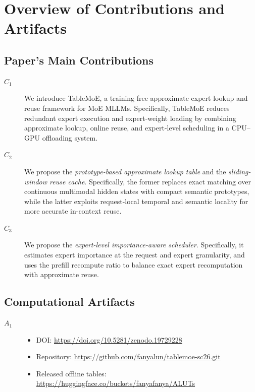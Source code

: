 \documentclass[conference]{IEEEtran}
\begin{document}

\appendixAD

\section{Overview of Contributions and Artifacts}

\subsection{Paper's Main Contributions}

\begin{description}
\item[$C_1$] We introduce TableMoE, a training-free approximate expert lookup
and reuse framework for MoE MLLMs. Specifically, TableMoE reduces redundant
expert execution and expert-weight loading by combining approximate lookup,
online reuse, and expert-level scheduling in a CPU--GPU offloading system.
\item[$C_2$] We propose the \textit{prototype-based approximate lookup table}
and the \textit{sliding-window reuse cache}. Specifically, the former replaces
exact matching over continuous multimodal hidden states with compact semantic
prototypes, while the latter exploits request-local temporal and semantic
locality for more accurate in-context reuse.
\item[$C_3$] We propose the \textit{expert-level importance-aware scheduler}.
Specifically, it estimates expert importance at the request and expert
granularity, and uses the prefill recompute ratio to balance exact expert
recomputation with approximate reuse.
\end{description}

\subsection{Computational Artifacts}

\begin{description}
\item[$A_1$]
\begin{itemize}
\item DOI: \url{https://doi.org/10.5281/zenodo.19729228}
\item Repository: \url{https://github.com/fanyalun/tablemoe-sc26.git}
\item Released offline tables:
\url{https://huggingface.co/buckets/fanyafanya/ALUTs}
\end{itemize}
\end{description}
\end{document}
